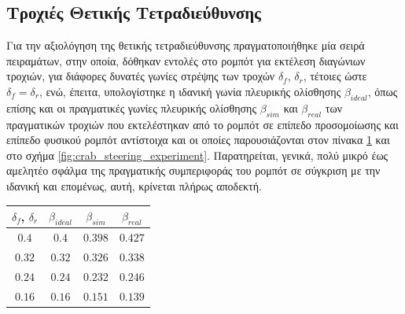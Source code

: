 \subsection{Τροχιές Θετικής Τετραδιεύθυνσης}
Για την αξιολόγηση της θετικής τετραδιεύθυνσης πραγματοποιήθηκε μία σειρά πειραμάτων, στην οποία, δόθηκαν εντολές στο ρομπότ για εκτέλεση διαγώνιων τροχιών, για διάφορες δυνατές γωνίες στρέψης των τροχών $\delta_f$, $\delta_r$, τέτοιες ώστε $\delta_f = \delta_r$, ενώ, έπειτα, υπολογίστηκε η ιδανική γωνία πλευρικής ολίσθησης $\beta_{ideal}$, όπως επίσης και οι πραγματικές γωνίες πλευρικής ολίσθησης $\beta_{sim}$ και $\beta_{real}$ των πραγματικών τροχιών που εκτελέστηκαν από το ρομπότ σε επίπεδο προσομοίωσης και επίπεδο φυσικού ρομπότ αντίστοιχα και οι οποίες παρουσιάζονται στον πίνακα \ref{tab:crab_steering_experiment} και στο σχήμα \ref{fig:crab_steering_experiment}. Παρατηρείται, γενικά, πολύ μικρό έως αμελητέο σφάλμα της πραγματικής συμπεριφοράς του ρομπότ σε σύγκριση με την ιδανική και επομένως, αυτή, κρίνεται πλήρως αποδεκτή.

\bigskip 
\begin{table}[!ht]
	\centering
	\label{tab:crab_steering_experiment}
	\begin{tabular}{c | c |  c | c}
	 	\textbf{$\delta_f$, $\delta_r$} & \textbf{$\beta_{ideal}$} & \textbf{$\beta_{sim}$} & \textbf{$\beta_{real}$} \\ \hline
	   $0.4$ & $0.4$ & $0.398$ & $0.427$\\
 	   $0.32$ & $0.32$ & $0.326$ & $0.338$\\
  	   $0.24$ & $0.24$ & $0.232$ & $0.246$\\
   	   $0.16$ & $0.16$ & $0.151$ & $0.139$\\
   	\end{tabular}
\end{table}

